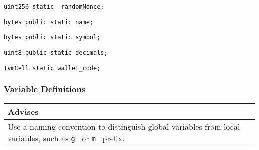 \begin{lstlisting}[firstnumber=28]
    uint256 static _randomNonce;
\end{lstlisting}

\begin{lstlisting}[firstnumber=30]
    bytes public static name;
\end{lstlisting}

\begin{lstlisting}[firstnumber=31]
    bytes public static symbol;
\end{lstlisting}

\begin{lstlisting}[firstnumber=32]
    uint8 public static decimals;
\end{lstlisting}

\begin{lstlisting}[firstnumber=34]
    TvmCell static wallet_code;
\end{lstlisting}

\subsubsection{Variable Definitions}


\ifsoldraft
\noindent\begin{tabular}{|p{12cm}|}\hline
\rowcolor{green}Advises
\\\hline
Use a naming convention to distinguish global variables from local variables, such as \verb+g_+ or \verb+m_+ prefix.
\\\hline\end{tabular}
\fi

